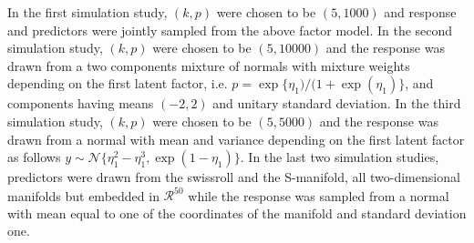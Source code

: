 \documentclass{article}
\providecommand{\mc}[1]{\mathcal{#1}}
\begin{document}
In the first simulation study, $(k,p)$ were chosen to be $(5,1000)$ and response and predictors were jointly sampled from the above factor model.  In the second simulation study, $(k,p)$ were chosen to be $(5,10000)$ and the response was drawn from a two components mixture of normals with mixture weights depending on the first latent factor, i.e. $p=\exp\{\eta_1)/(1+\exp(\eta_1)\}$, and components having means $(-2,2)$ and unitary standard deviation.  In the third simulation study, $(k,p)$ were chosen to be $(5,5000)$ and the response was drawn from a normal with mean and variance depending on the first latent factor as follows $y \sim \mc{N}\{\eta_1^2-\eta_1^3, \exp(1-\eta_1)\}$. In the last two simulation studies, predictors were drawn from the swissroll and the S-manifold, all two-dimensional manifolds but embedded in $\mathcal{R}^{50}$ while the response was sampled from a normal with mean equal to one of the coordinates of the manifold and standard deviation one.
\end{document}
